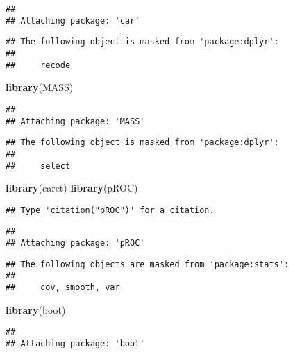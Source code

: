 \documentclass[
]{article}
\newenvironment{Shaded}{\begin{snugshade}}{\end{snugshade}}
\newcommand{\KeywordTok}[1]{\textcolor[rgb]{0.13,0.29,0.53}{\textbf{#1}}}
\newcommand{\NormalTok}[1]{#1}
\begin{document}
\begin{verbatim}
## 
## Attaching package: 'car'
\end{verbatim}

\begin{verbatim}
## The following object is masked from 'package:dplyr':
## 
##     recode
\end{verbatim}

\begin{Shaded}
\begin{Highlighting}[]
\KeywordTok{library}\NormalTok{(MASS)}
\end{Highlighting}
\end{Shaded}

\begin{verbatim}
## 
## Attaching package: 'MASS'
\end{verbatim}

\begin{verbatim}
## The following object is masked from 'package:dplyr':
## 
##     select
\end{verbatim}

\begin{Shaded}
\begin{Highlighting}[]
\KeywordTok{library}\NormalTok{(caret)}
\KeywordTok{library}\NormalTok{(pROC)}
\end{Highlighting}
\end{Shaded}

\begin{verbatim}
## Type 'citation("pROC")' for a citation.
\end{verbatim}

\begin{verbatim}
## 
## Attaching package: 'pROC'
\end{verbatim}

\begin{verbatim}
## The following objects are masked from 'package:stats':
## 
##     cov, smooth, var
\end{verbatim}

\begin{Shaded}
\begin{Highlighting}[]
\KeywordTok{library}\NormalTok{(boot)}
\end{Highlighting}
\end{Shaded}

\begin{verbatim}
## 
## Attaching package: 'boot'
\end{verbatim}
\end{document}
